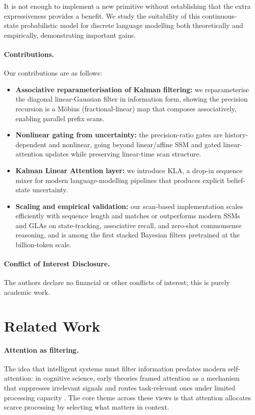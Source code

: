 \documentclass{article}
\begin{document}
It is not enough to implement a new primitive without establishing that the extra expressiveness provides a benefit. We study the suitability of this continuous-state probabilistic model for discrete language modelling both theoretically and empirically, demonstrating important gains. 

\paragraph{Contributions.} Our contributions are as follows:
\begin{itemize}
    \item[\textbf{C1}] \textbf{Associative reparameterisation of Kalman filtering:} we reparameterise the diagonal linear-Gaussian filter in information form, showing the precision recursion is a M\"obius (fractional-linear) map that composes associatively, enabling parallel prefix scans.
    \item[\textbf{C2}] \textbf{Nonlinear gating from uncertainty:} the precision-ratio gates are history-dependent and nonlinear, going beyond linear/affine SSM and gated linear-attention updates while preserving linear-time scan structure.
    \item[\textbf{C3}] \textbf{Kalman Linear Attention layer:} we introduce \textsc{KLA}, a drop-in sequence mixer for modern language-modelling pipelines that produces explicit belief-state uncertainty.
    \item[\textbf{C4}] \textbf{Scaling and empirical validation:} our scan-based implementation scales efficiently with sequence length and matches or outperforms modern SSMs and GLAs on state-tracking, associative recall, and zero-shot commonsense reasoning, and is among the first stacked Bayesian filters pretrained at the billion-token scale.
\end{itemize}
\paragraph{Conflict of Interest Disclosure.}
The authors declare no financial or other conflicts of interest; this is purely academic work.

\section{Related Work}

\paragraph{Attention as filtering.}
The idea that intelligent systems must filter information predates modern self-attention: in cognitive science, early theories framed attention as a mechanism that suppresses irrelevant signals and routes task-relevant ones under limited processing capacity
\citep{broadbent1957mechanical,treisman1969strategies,deutsch1963attention, nielsen2009statistical}.
The core theme across these views is that attention allocates scarce processing by selecting what matters in context.
\end{document}
